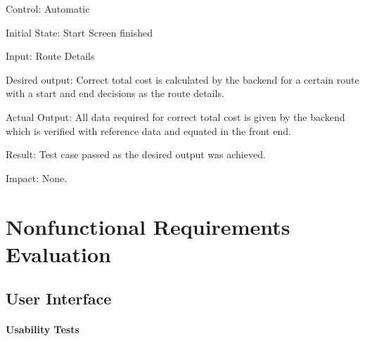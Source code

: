 \documentclass[12pt, titlepage]{article}
\begin{document}
\begin{enumerate}
Control: Automatic
					
Initial State: Start Screen finished
					
Input: Route Details

Desired output: Correct total cost is calculated by the backend for a certain route with a start and end decisions as the route details.

Actual Output: All data required for correct total cost is given by the backend which is verified with reference data and equated in the front end.

Result: Test case passed as the desired output was achieved.

Impact: None.

\end{enumerate}

\section{Nonfunctional Requirements Evaluation}

\subsection{User Interface}
		
\paragraph{Usability Tests}
\end{document}
